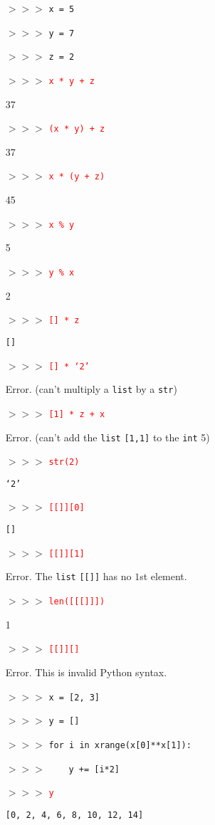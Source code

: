 \documentclass[11pt]{article}
\newcommand{\ans}[1]{\textcolor{red}{#1}}
\begin{document}
\begin{itemize}
\item[$>>>$]\texttt{x = 5}
\item[$>>>$]\texttt{y = 7}
\item[$>>>$]\texttt{z = 2}
\item[$>>>$]\ans{\texttt{x * y + z}}
\item[] 37
\item[$>>>$]\ans{\texttt{(x * y) + z}}
\item[] 37
\item[$>>>$]\ans{\texttt{x * (y + z)}}
\item[] 45
\item[$>>>$]\ans{\texttt{x \% y}}
\item[] 5
\item[$>>>$]\ans{\texttt{y \% x}}
\item[] 2
\item[$>>>$]\ans{\texttt{[] * z}}
\item[] \texttt{[]}
\item[$>>>$]\ans{\texttt{[] * `2'}}
\item[] Error. (can't multiply a \texttt{list} by a \texttt{str})
\item[$>>>$]\ans{\texttt{[1] * z + x}}
\item[] Error. (can't add the \texttt{list} \texttt{[1,1]} to the
  \texttt{int} 5)
\item[$>>>$]\ans{\texttt{str(2)}}
\item[] \texttt{`2'}
\item[$>>>$]\ans{\texttt{[[]][0]}}
\item[] \texttt{[]}
\item[$>>>$]\ans{\texttt{[[]][1]}}
\item[] Error. The \texttt{list} \texttt{[[]]} has no $1$st element.
\item[$>>>$]\ans{\texttt{len([[[]]])}}
\item[] 1
\item[$>>>$]\ans{\texttt{[[]][]}}
\item[] Error. This is invalid Python syntax.
\item[$>>>$] \texttt{x = [2, 3]}
\item[$>>>$] \texttt{y = []}
\item[$>>>$] \texttt{for i in xrange(x[0]**x[1]):}
\item[$>>>$] \ \ \ \ \texttt{y += [i*2]}
\item[$>>>$] \ans{\texttt{y}}
\item[] \texttt{[0, 2, 4, 6, 8, 10, 12, 14]}

\end{itemize}
\end{document}
